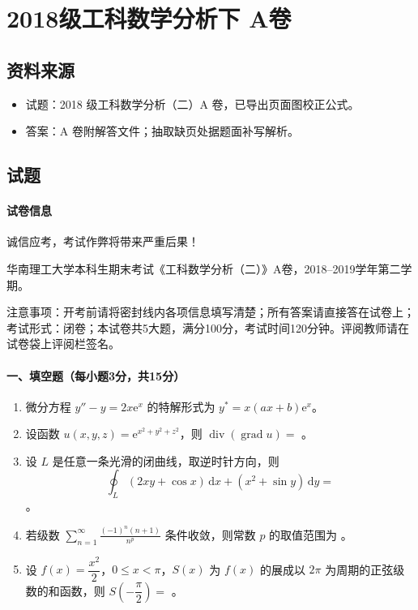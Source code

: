 \section{2018级工科数学分析下 A卷}

\subsection{资料来源}
\begin{itemize}
  \item 试题：2018 级工科数学分析（二）A 卷，已导出页面图校正公式。
  \item 答案：A 卷附解答文件；抽取缺页处据题面补写解析。
\end{itemize}

\subsection{试题}

\paragraph*{试卷信息}
诚信应考，考试作弊将带来严重后果！

华南理工大学本科生期末考试《工科数学分析（二）》A卷，2018--2019学年第二学期。

注意事项：开考前请将密封线内各项信息填写清楚；所有答案请直接答在试卷上；考试形式：闭卷；本试卷共5大题，满分100分，考试时间120分钟。评阅教师请在试卷袋上评阅栏签名。

\paragraph*{一、填空题（每小题3分，共15分）}
\begin{enumerate}
  \item 微分方程 \(y''-y=2x\mathrm{e}^x\) 的特解形式为 \(y^*=x(ax+b)\mathrm{e}^x\)。
  \item 设函数 \(u(x,y,z)=\mathrm{e}^{x^2+y^2+z^2}\)，则 \(\operatorname{div}(\operatorname{grad}u)=\) \underline{\hspace{5cm}}。
  \item 设 \(L\) 是任意一条光滑的闭曲线，取逆时针方向，则
  \[
    \oint_L(2xy+\cos x)\,\mathrm{d}x+(x^2+\sin y)\,\mathrm{d}y=
  \]
  \underline{\hspace{5cm}}。
  \item 若级数 \(\displaystyle \sum_{n=1}^{\infty}\frac{(-1)^n(n+1)}{n^p}\) 条件收敛，则常数 \(p\) 的取值范围为 \underline{\hspace{5cm}}。
  \item 设 \(f(x)=\dfrac{x^2}{2}\)，\(0\le x<\pi\)，\(S(x)\) 为 \(f(x)\) 的展成以 \(2\pi\) 为周期的正弦级数的和函数，则
  \(S\left(-\dfrac{\pi}{2}\right)=\) \underline{\hspace{5cm}}。
\end{enumerate}

